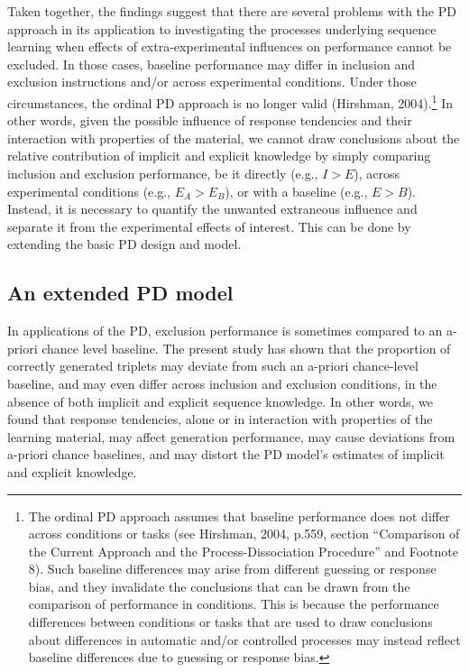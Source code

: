 \documentclass[
  english,
  man]{apa6}
\begin{document}
Taken together, the findings suggest that there are several problems with the PD approach in its application to investigating the processes underlying sequence learning when effects of extra-experimental influences on performance cannot be excluded.
In those cases, baseline performance may differ in inclusion and exclusion instructions and/or across experimental conditions.
Under those circumstances, the ordinal PD approach is no longer valid (Hirshman, 2004).\footnote{The ordinal PD approach assumes that baseline performance does not differ across conditions or tasks (see Hirshman, 2004, p.559, section ``Comparison of the Current Approach and the Process-Dissociation Procedure'' and Footnote 8). Such baseline differences may arise from different guessing or response bias, and they invalidate the conclusions that can be drawn from the comparison of performance in conditions. This is because the performance differences between conditions or tasks that are used to draw conclusions about differences in automatic and/or controlled processes may instead reflect baseline differences due to guessing or response bias.}
In other words, given the possible influence of response tendencies and their interaction with properties of the material, we cannot draw conclusions about the relative contribution of implicit and explicit knowledge by simply comparing inclusion and exclusion performance, be it directly (e.g., \(I > E\)), across experimental conditions (e.g., \(E_A > E_B\)), or with a baseline (e.g., \(E > B\)).
Instead, it is necessary to quantify the unwanted extraneous influence and separate it from the experimental effects of interest.
This can be done by extending the basic PD design and model.

\hypertarget{an-extended-pd-model}{%
\subsection{An extended PD model}\label{an-extended-pd-model}}

In applications of the PD, exclusion performance is sometimes compared to an a-priori chance level baseline.
The present study has shown that the proportion of correctly generated triplets may deviate from such an a-priori chance-level baseline, and may even differ across inclusion and exclusion conditions, in the absence of both implicit and explicit sequence knowledge.
In other words, we found that response tendencies, alone or in interaction with properties of the learning material, may affect generation performance, may cause deviations from a-priori chance baselines, and may distort the PD model's estimates of implicit and explicit knowledge.
\end{document}

